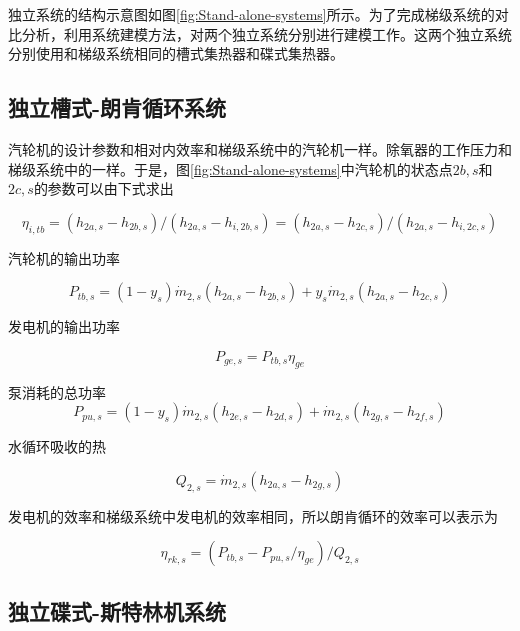 独立系统的结构示意图如图\ref{fig:Stand-alone-systems}所示。为了完成梯级系统的对比分析，利用系统建模方法，对两个独立系统分别进行建模工作。这两个独立系统分别使用和梯级系统相同的槽式集热器和碟式集热器。

\subsection{独立槽式-朗肯循环系统}

汽轮机的设计参数和相对内效率和梯级系统中的汽轮机一样。除氧器的工作压力和梯级系统中的一样。于是，图\ref{fig:Stand-alone-systems}中汽轮机的状态点$2b,s$和$2c,s$的参数可以由下式求出

\begin{equation}
	\eta_{i,tb}= (h_{2a,s}-h_{2b,s})/(h_{2a,s}-h_{i,2b,s}) = (h_{2a,s}-h_{2c,s})/(h_{2a,s}-h_{i,2c,s})
\end{equation}

汽轮机的输出功率

\begin{equation}
	P_{tb,s}=\left(1-y_{s}\right)\dot{m}_{2,s}\left(h_{2a,s}-h_{2b,s}\right)+y_{s}\dot{m}_{2,s}\left(h_{2a,s}-h_{2c,s}\right)
\end{equation}

发电机的输出功率

\begin{equation}
	P_{ge,s}=P_{tb,s}\eta_{ge}
\end{equation}

泵消耗的总功率
\begin{equation}
	P_{pu,s}=\left(1-y_{s}\right)\dot{m}_{2,s}\left(h_{2e,s}-h_{2d,s}\right)+\dot{m}_{2,s}\left(h_{2g,s}-h_{2f,s}\right)
\end{equation}

水循环吸收的热

\begin{equation}
	Q_{2,s}=\dot{m}_{2,s}\left(h_{2a,s}-h_{2g,s}\right)
\end{equation}

发电机的效率和梯级系统中发电机的效率相同，所以朗肯循环的效率可以表示为

\begin{equation}
	\eta_{rk,s}=(P_{tb,s}-P_{pu,s}/\eta_{ge})/Q_{2,s}
\end{equation}

\subsection{独立碟式-斯特林机系统}

